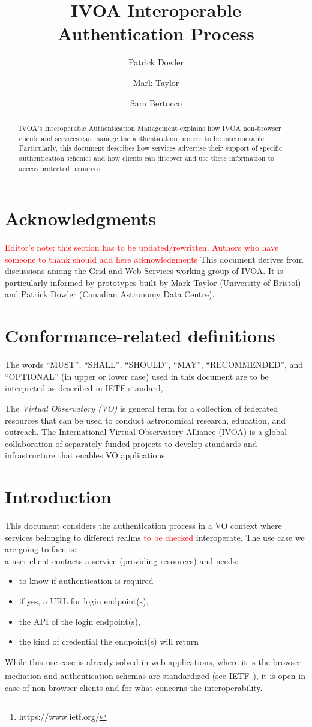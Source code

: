 \documentclass[11pt,a4paper]{ivoa}
\title{IVOA Interoperable Authentication Process}
\author{Patrick Dowler}
\author{Mark Taylor}
\author{Sara Bertocco}
\begin{document}
\begin{abstract}
IVOA's Interoperable Authentication Management explains how 
IVOA non-browser clients and services can manage the 
authentication process 
to be interoperable. Particularly, this document
describes how services advertise their
support of specific authentication schemes and how
clients can discover and use these information to access protected 
resources.

\end{abstract}

\section*{Acknowledgments}
\textcolor{red}{Editor's note: this section has to be 
updated/rewritten. Authors who have someone to thank should
add here acknowledgments}
This document derives from discussions among the Grid and Web Services
working-group of IVOA. It is particularly informed by prototypes built
by Mark Taylor (University of Bristol) and Patrick Dowler
(Canadian Astronomy Data Centre).



\section*{Conformance-related definitions}
The words ``MUST'', ``SHALL'', ``SHOULD'', ``MAY'', ``RECOMMENDED'', and
``OPTIONAL'' (in upper or lower case) used in this document are to be
interpreted as described in IETF standard, \citet{std:RFC2119}.

The \emph{Virtual Observatory (VO)} is
general term for a collection of federated resources that can be used
to conduct astronomical research, education, and outreach.
The \href{http://www.ivoa.net}{International
Virtual Observatory Alliance (IVOA)} is a global
collaboration of separately funded projects to develop standards and
infrastructure that enables VO applications.


\section{Introduction}
This document considers the authentication process in a VO context
where services belonging to different realms
\textcolor{red}{to be checked}
interoperate. The use 
case we are going to face is:\\
a user client contacts a service (providing resources) and needs: \begin{itemize}
    \item to know if authentication is required
    \item if yes, a URL for login endpoint(s),
    \item the API of the login endpoint(s),
    \item the kind of credential the endpoint(s) will return
\end{itemize}
While this use case is already solved in web applications,
where it is the browser mediation and authentication schemas 
are standardized (see
IETF\footnote{https://www.ietf.org/}), it is open
in case of non-browser clients and for what concerns the
interoperability.
\end{document}
